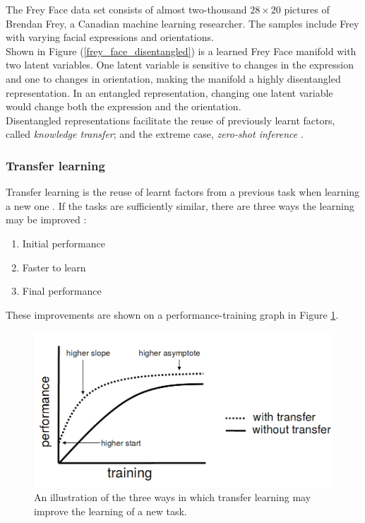 \documentclass[12pt,twoside]{article}
\begin{document}
The Frey Face data set consists of almost two-thousand $28\times20$ pictures of Brendan Frey, a Canadian machine learning researcher. The samples include Frey with varying facial expressions and orientations.\\

Shown in Figure (\ref{frey_face_disentangled}) is a learned Frey Face manifold with two latent variables. One latent variable is sensitive to changes in the expression and one to changes in orientation, making the manifold a highly disentangled representation. In an entangled representation, changing one latent variable would change both the expression and the orientation.\\

Disentangled representations facilitate the reuse of previously learnt factors, called \textit{knowledge transfer}; and the extreme case, \textit{zero-shot inference} \cite{IanGoodfellowYoshuaBengio2015,Higgins2016}.

\subsubsection{Transfer learning}
Transfer learning is the reuse of learnt factors from a previous task when learning a new one \cite{IanGoodfellowYoshuaBengio2015}. If the tasks are sufficiently similar, there are three ways the learning may be improved \cite{Torrey2009}:

\begin{enumerate}
\item Initial performance
\item Faster to learn
\item Final performance
\end{enumerate}

These improvements are shown on a performance-training graph in Figure \ref{transfer_learning_three_ways}.\\

\begin{figure}
\includegraphics[scale=0.3]{figures/torrey_2009_2.png}
\centering
\captionsetup{justification=centering}
\caption{An illustration of the three ways in which transfer learning may improve the learning of a new task. \cite{Torrey2009}}
\label{transfer_learning_three_ways}
\end{figure}
\end{document}
